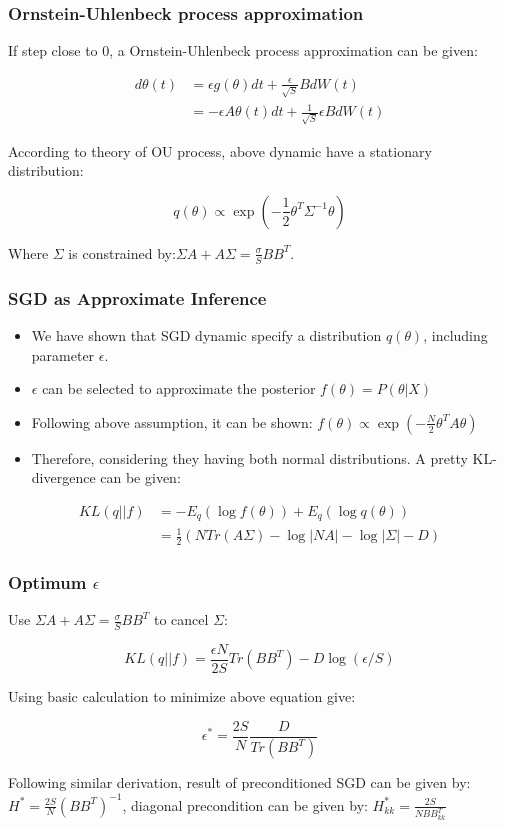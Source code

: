 \documentclass{beamer}
\begin{document}
\begin{frame}

    \frametitle{Ornstein-Uhlenbeck process approximation}

    If step close to $0$, a Ornstein-Uhlenbeck process approximation can be given:

    \begin{align*}
    d\theta(t) &= \epsilon g(\theta) dt+ \frac{\epsilon}{\sqrt{S}} B dW(t) \\
        &= - \epsilon A \theta(t)dt+\frac{1}{\sqrt{S}}\epsilon B dW(t)
    \end{align*}

    According to theory of OU process, above dynamic have a stationary distribution:
    
    $$
    q(\theta) \propto \exp(-\frac{1}{2} \theta^T\Sigma^{-1}\theta) 
    $$

    Where $\Sigma$ is constrained by:$\Sigma A + A\Sigma = \frac{\sigma}{S} BB^T$.

\end{frame}

\begin{frame}
    \frametitle{SGD as Approximate Inference}
    \begin{itemize}
    \item We have shown that SGD dynamic specify a distribution $q(\theta)$, including parameter $\epsilon$.
    \item $\epsilon$ can be selected to approximate the posterior $f(\theta) = P(\theta | X)$
    \item Following above assumption, it can be shown: $f(\theta) \propto \exp(-\frac{N}{2} \theta^T A \theta)$
    \item Therefore, considering they having both normal distributions. A pretty KL-divergence can be given:
    \end{itemize}

    \begin{align*}
    KL(q||f) &= -E_q (\log f(\theta)) + E_q (\log q(\theta)) \\
        &= \frac{1}{2}( NTr(A\Sigma) - \log|NA| - \log |\Sigma| - D )
    \end{align*}

\end{frame}

\begin{frame}
    \frametitle{Optimum $\epsilon$}
    Use $\Sigma A + A\Sigma = \frac{\sigma}{S} BB^T$ to cancel $\Sigma$:

    $$
    KL(q||f) = \frac{\epsilon N}{2S} Tr(BB^T) - D\log (\epsilon/S)
    $$

    Using basic calculation to minimize above equation give:
    
    $$
    \epsilon^* = \frac{2S}{N}\frac{D}{Tr(BB^T)}
    $$

    Following similar derivation, result of preconditioned SGD can be given by:
    $H^*=\frac{2S}{N}(BB^T)^{-1}$, diagonal precondition can be given by:
    $H^*_{kk} = \frac{2S}{NBB_{kk}^T}$


\end{frame}
\end{document}
